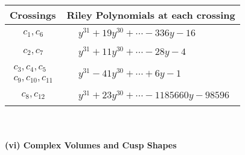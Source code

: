 \documentclass[1p]{elsarticle_modified}
\theoremstyle{definition}
\begin{document}
\begin{tabular}{m{50pt}|m{274pt}}
Crossings & \hspace{64pt}Riley Polynomials at each crossing \\
\hline $$\begin{aligned}c_{1},c_{6}\end{aligned}$$&$\begin{aligned}
&y^{31}+19 y^{30}+\cdots-336 y-16
\end{aligned}$\\
\hline $$\begin{aligned}c_{2},c_{7}\end{aligned}$$&$\begin{aligned}
&y^{31}+11 y^{30}+\cdots-28 y-4
\end{aligned}$\\
\hline $$\begin{aligned}c_{3},c_{4},c_{5}\\c_{9},c_{10},c_{11}\end{aligned}$$&$\begin{aligned}
&y^{31}-41 y^{30}+\cdots+6 y-1
\end{aligned}$\\
\hline $$\begin{aligned}c_{8},c_{12}\end{aligned}$$&$\begin{aligned}
&y^{31}+23 y^{30}+\cdots-1185660 y-98596
\end{aligned}$\\
\hline
\end{tabular}\\~\\
\newpage\flushleft \textbf{(vi) Complex Volumes and Cusp Shapes}
\end{document}
